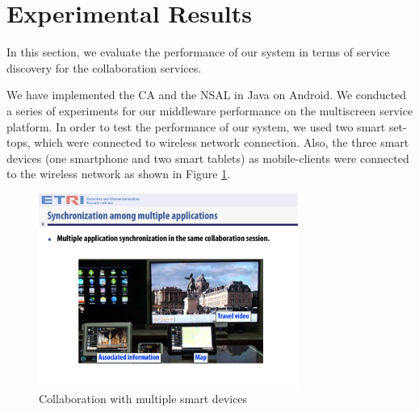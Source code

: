 \documentclass{sig-alternate}
\begin{document}
%
\section{Experimental Results}
\label{sc:Experiments}
In this section, we evaluate the performance of our system in terms of service discovery for the collaboration services. 

We have implemented the CA and the NSAL in Java on Android. 
We conducted a series of experiments for our middleware performance  on the multiscreen service platform. 
In order to test the performance of our system, we used two smart set-tops, 
which were connected to wireless network connection. Also, the three smart devices (one smartphone and two smart tablets) as mobile-clients 
were connected to the wireless network as shown in Figure \ref{fig:multiplecollaboration}. 
    \begin{figure}[htb] %
    \centering
    \includegraphics[width=8.5cm,keepaspectratio]{multiplecollaboration}
    \caption{Collaboration with multiple smart devices}
    \label{fig:multiplecollaboration}
    \end{figure}
\end{document}

